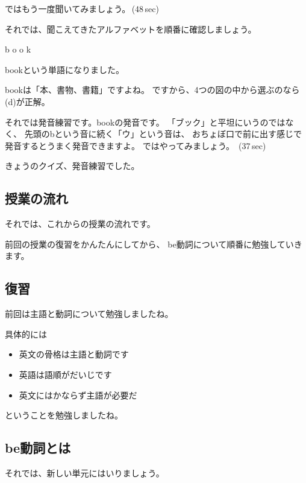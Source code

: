 \documentclass[12pt]{jlreq}
\begin{document}
ではもう一度聞いてみましょう。\faVolumeUp\,(48\,sec)

それでは、聞こえてきたアルファベットを順番に確認しましょう。{\large \ComputerMouse}

b
{\large \ComputerMouse}
o
{\large \ComputerMouse}
o
{\large \ComputerMouse}
k

bookという単語になりました。

bookは「本、書物、書籍」ですよね。
ですから、4つの図の中から選ぶのなら(d)が正解。

それでは発音練習です。bookの発音です。
「ブック」と平坦にいうのではなく、
先頭のbという音に続く「ウ」という音は、
おちょぼ口で前に出す感じで発音するとうまく発音できますよ。
ではやってみましょう。
\faVolumeUp\,(37\,sec)

きょうのクイズ、発音練習でした。

{\large \ComputerMouse}

\subsection{授業の流れ}

それでは、これからの授業の流れです。

{\large \ComputerMouse}

前回の授業の復習をかんたんにしてから、
be動詞について順番に勉強していきます。

{\large \ComputerMouse}

\newpage
\subsection{復習}

前回は主語と動詞について勉強しましたね。

具体的には

{\large \ComputerMouse}

\begin{itemize}
 \item   英文の骨格は主語と動詞です
 \item   英語は語順がだいじです
 \item   英文にはかならず主語が必要だ
\end{itemize}
ということを勉強しましたね。

{\large \ComputerMouse}

\newpage
\subsection{be動詞とは}
それでは、新しい単元にはいりましょう。
\end{document}
